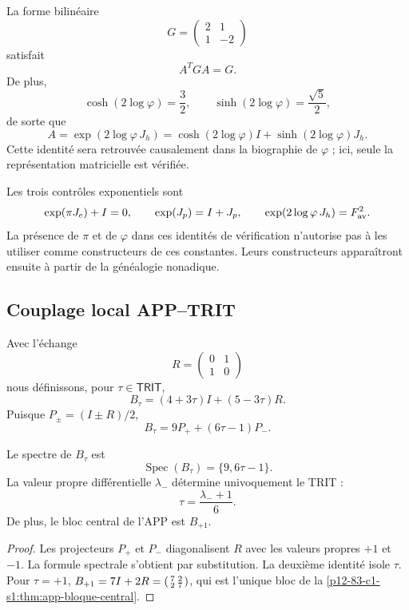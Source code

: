 La forme bilinéaire
\[
 G=\begin{pmatrix}2&1\\1&-2\end{pmatrix}
\]
satisfait
\[
 A^TGA=G.
\]
De plus,
\[
 \cosh(2\log\varphi)=\frac32,
 \qquad
 \sinh(2\log\varphi)=\frac{\sqrt5}{2},
\]
de sorte que
\[
 A=\exp(2\log\varphi\,J_h)
  =\cosh(2\log\varphi)I+\sinh(2\log\varphi)J_h.
\]
Cette identité sera retrouvée causalement dans la biographie de
\(\varphi\) ; ici, seule la représentation matricielle est vérifiée.

Les trois contrôles exponentiels sont
\[
 \exp(\pi J_e)+I=0,
 \qquad
 \exp(J_p)=I+J_p,
 \qquad
 \exp(2\log\varphi\,J_h)=F_{\rm av}^2.
\]
La présence de \(\pi\) et de \(\varphi\) dans ces identités de vérification
n’autorise pas à les utiliser comme constructeurs de ces constantes. Leurs
constructeurs apparaîtront ensuite à partir de la généalogie nonadique.

\subsection{Couplage local APP--TRIT}

Avec l’échange
\[
 R=\begin{pmatrix}0&1\\1&0\end{pmatrix}
\]
nous définissons, pour \(\tau\in\mathsf{TRIT}\),
\[
 B_\tau=(4+3\tau)I+(5-3\tau)R.
\]
Puisque \(P_\pm=(I\pm R)/2\),
\[
 B_\tau=9P_++(6\tau-1)P_-.
\]

\begin{theorem}
\label{p12-83-c1-s11:thm:app-trit-recuperacion-espectral}
Le spectre de \(B_\tau\) est
\[
 \operatorname{Spec}(B_\tau)=\{9,6\tau-1\}.
\]
La valeur propre différentielle \(\lambda_-\) détermine univoquement le TRIT :
\[
 \tau=\frac{\lambda_-+1}{6}.
\]
De plus, le bloc central de l’APP est \(B_{+1}\).
\end{theorem}

\begin{proof}
Les projecteurs \(P_+\) et \(P_-\) diagonalisent \(R\) avec les valeurs propres
\(+1\) et \(-1\). La formule spectrale s’obtient par substitution. La deuxième
identité isole \(\tau\). Pour \(\tau=+1\),
\(B_{+1}=7I+2R=\begin{psmallmatrix}7&2\\2&7\end{psmallmatrix}\), qui est
l’unique bloc de la \cref{p12-83-c1-s1:thm:app-bloque-central}.
\end{proof}

